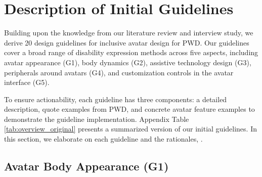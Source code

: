 \section{Description of Initial Guidelines}

Building upon the knowledge from our literature review and interview study, 
we derive 20 design guidelines for inclusive avatar design for PWD. Our guidelines cover a broad range of disability expression methods across five aspects, including avatar appearance (G1), body dynamics (G2), assistive technology design (G3), peripherals around avatars (G4), and customization controls in the avatar interface (G5). 

To ensure actionability, each guideline has three components: a detailed description, quote examples from PWD, and concrete avatar feature examples to demonstrate the guideline implementation. %
Appendix Table \ref{tab:overview_original} %
presents a summarized version of our initial guidelines. %
In this section, we elaborate on each guideline and the rationales, . %


\subsection{Avatar Body Appearance (G1)}

